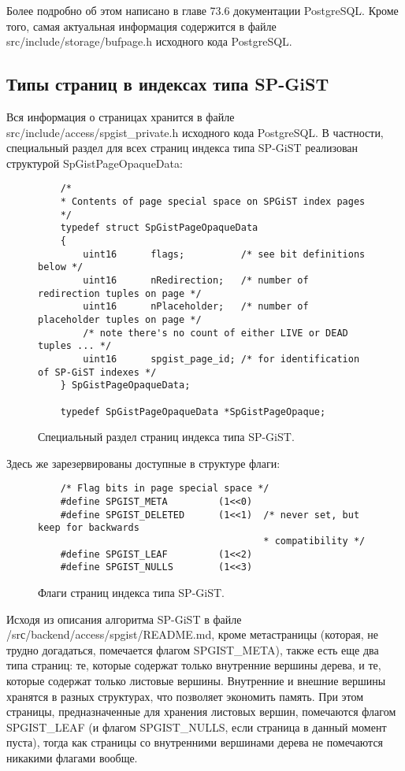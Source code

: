 \documentclass[12pt,oneside]{amsart}
\begin{document}
Более подробно об этом написано в главе 73.6 документации PostgreSQL. Кроме того, самая актуальная информация содержится в файле src/include/storage/bufpage.h исходного кода PostgreSQL.



\subsection{Типы страниц в индексах типа SP-GiST}

Вся информация о страницах хранится в файле src/include/access/spgist\_private.h исходного кода PostgreSQL. В частности, специальный раздел для всех страниц индекса типа SP-GiST реализован структурой SpGistPageOpaqueData:

\begin{figure}[ht!]
\begin{lstlisting}
	/*
	* Contents of page special space on SPGiST index pages
	*/
	typedef struct SpGistPageOpaqueData
	{
		uint16		flags;			/* see bit definitions below */
		uint16		nRedirection;	/* number of redirection tuples on page */
		uint16		nPlaceholder;	/* number of placeholder tuples on page */
		/* note there's no count of either LIVE or DEAD tuples ... */
		uint16		spgist_page_id; /* for identification of SP-GiST indexes */
	} SpGistPageOpaqueData;

	typedef SpGistPageOpaqueData *SpGistPageOpaque;
\end{lstlisting}
\caption{Специальный раздел страниц индекса типа SP-GiST.}\label{spOpaque}
\end{figure}

Здесь же зарезервированы доступные в структуре флаги:
\begin{figure}[ht!]
\begin{lstlisting}
	/* Flag bits in page special space */
	#define SPGIST_META			(1<<0)
	#define SPGIST_DELETED		(1<<1)	/* never set, but keep for backwards
										* compatibility */
	#define SPGIST_LEAF			(1<<2)
	#define SPGIST_NULLS		(1<<3)
\end{lstlisting}
\caption{Флаги страниц индекса типа SP-GiST.}\label{spPageFlags}
\end{figure}

Исходя из описания алгоритма SP-GiST в файле /srс/backend/access/spgist/README.md, кроме метастраницы (которая, не трудно догадаться, помечается флагом SPGIST\_META), также есть еще два типа страниц: те, которые содержат только внутренние вершины дерева, и те, которые содержат только листовые вершины. Внутренние и внешние вершины хранятся в разных структурах, что позволяет экономить память. При этом страницы, предназначенные для хранения листовых вершин, помечаются флагом SPGIST\_LEAF (и флагом SPGIST\_NULLS, если страница в данный момент пуста), тогда как страницы со внутренними вершинами дерева не помечаются никакими флагами вообще.
\end{document}
